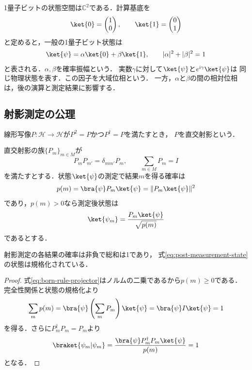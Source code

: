1量子ビットの状態空間は$\mathbb C^2$である．計算基底を
\begin{equation}
  \ket{0}=\begin{pmatrix}1\\0\end{pmatrix},
  \qquad
  \ket{1}=\begin{pmatrix}0\\1\end{pmatrix}
\end{equation}
と定めると，一般の1量子ビット状態は
\begin{equation}
  \ket{\psi}=\alpha\ket{0}+\beta\ket{1},
  \qquad |\alpha|^2+|\beta|^2=1
  \label{eq:single-qubit-state}
\end{equation}
と表される．$\alpha,\beta$を確率振幅という．
実数$\gamma$に対して$\ket{\psi}$と$e^{\mathrm{i}\gamma}\ket{\psi}$は
同じ物理状態を表す．この因子を大域位相という．
一方，$\alpha$と$\beta$の間の相対位相は，後の演算と測定結果に影響する．

\subsection{射影測定の公理}

\begin{defi}[直交射影]
線形写像$P:\mathcal H\to\mathcal H$が$P^2=P$かつ$P^\dagger=P$を満たすとき，
$P$を直交射影という．
\end{defi}

\begin{defi}[射影測定]
直交射影の族$\{P_m\}_{m\in M}$が
\begin{equation}
  P_mP_{m'}=\delta_{mm'}P_m,
  \qquad \sum_{m\in M}P_m=I
  \label{eq:projective-measurement-completeness}
\end{equation}
を満たすとする．状態$\ket{\psi}$の測定で結果$m$を得る確率は
\begin{equation}
  p(m)=\bra{\psi}P_m\ket{\psi}
      =\lVert P_m\ket{\psi}\rVert^2
  \label{eq:born-rule-projector}
\end{equation}
であり，$p(m)>0$なら測定後状態は
\begin{equation}
  \ket{\psi_m}=\frac{P_m\ket{\psi}}{\sqrt{p(m)}}
  \label{eq:post-measurement-state}
\end{equation}
であるとする．
\end{defi}

\begin{prop}
射影測定の各結果の確率は非負で総和は1であり，
式\eqref{eq:post-measurement-state}の状態は規格化されている．
\end{prop}
\begin{proof}
式\eqref{eq:born-rule-projector}はノルムの二乗であるから$p(m)\geq0$である．
完全性関係と状態の規格化より
\[
  \sum_m p(m)
  =\bra{\psi}\left(\sum_mP_m\right)\ket{\psi}
  =\bra{\psi}I\ket{\psi}=1
\]
を得る．さらに$P_m^\dagger P_m=P_m$より
\[
  \braket{\psi_m|\psi_m}
  =\frac{\bra{\psi}P_m^\dagger P_m\ket{\psi}}{p(m)}=1
\]
となる．
\end{proof}

